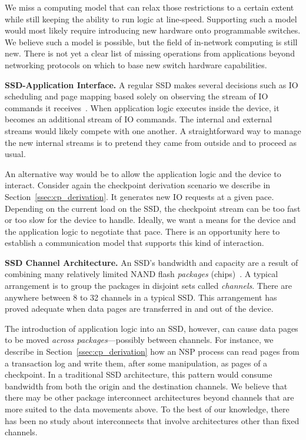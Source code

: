 \documentclass[11pt,dvipdfmx]{article}
\newcommand{\softsubsec}[1]{\vspace{0.6em}\noindent\textbf{#1}}
\begin{document}
We miss a computing model that can relax those restrictions to a certain extent
while still keeping the ability to run logic at line-speed.
Supporting such a model would most likely require introducing new hardware onto
programmable switches.
We believe such a model is possible, but the field of in-network computing is
still new.
There is not yet a clear list of missing operations from applications beyond
networking protocols on which to base new switch hardware capabilities.


\softsubsec{SSD-Application Interface.}
%
A regular SSD makes several decisions such as IO scheduling and page mapping
based solely on observing the stream of IO commands it receives~\cite{nam11}.
When application logic executes inside the device, it becomes an additional
stream of IO commands.
The internal and external streams would likely compete with one another.
A straightforward way to manage the new internal streams is to pretend they came
from outside and to proceed as usual.


An alternative way would be to allow the application logic and the device to
interact.
Consider again the checkpoint derivation scenario we describe in
Section~\ref{ssec:cp_derivation}.
It generates new IO requests at a given pace.
Depending on the current load on the SSD, the checkpoint stream can be too fast or
too slow for the device to handle.
Ideally, we want a means for the device and the application logic to negotiate
that pace.
There is an opportunity here to establish a communication model that supports
this kind of interaction.


\softsubsec{SSD Channel Architecture.}
%
An SSD's bandwidth and capacity are a result of combining many relatively
limited NAND flash \emph{packages} (chips)~\cite{micheloni12}.
A typical arrangement is to group the packages in disjoint sets called
\emph{channels}.
There are anywhere between 8 to 32 channels in a typical SSD.
This arrangement has proved adequate when data pages are transferred in and out
of the device.


The introduction of application logic into an SSD, however, can cause data
pages to be moved \emph{across packages}---possibly between channels.
For instance, we describe in Section~\ref{ssec:cp_derivation} how an NSP process
can read pages from a transaction log and write them, after some manipulation,
as pages of a checkpoint.
In a traditional SSD architecture, this pattern would consume bandwidth from
both the origin and the destination channels.
We believe that there may be other package interconnect architectures
beyond channels that are more suited to the data movements above.
To the best of our knowledge, there has been no study about interconnects that
involve architectures other than fixed channels.
\end{document}
